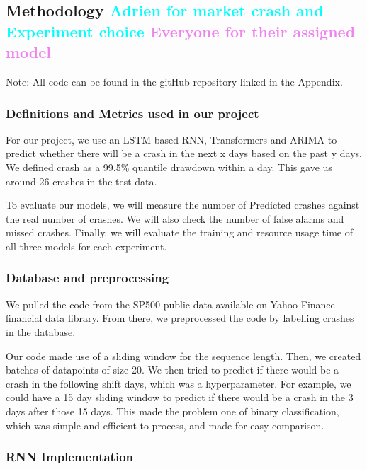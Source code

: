 \documentclass[12pt, letterpaper]{article}
\begin{document}
\subsection*{Methodology \textcolor{cyan}{Adrien for market crash and Experiment choice} \textcolor{violet}{Everyone for their assigned model}}
Note: All code can be found in the gitHub repository linked in the Appendix.
\subsubsection*{Definitions and Metrics used in our project}

For our project, we use an LSTM-based RNN, Transformers and ARIMA to predict whether there will be a crash in the next x days based on the past y days. We defined crash as a 99.5\% quantile drawdown within a day. This gave us around 26 crashes in the test data.

To evaluate our models, we will measure the number of Predicted crashes against the real number of crashes. We will also check the number of false alarms and missed crashes. Finally, we will evaluate the training and resource usage time of all three models for each experiment.

\subsubsection*{Database and preprocessing}

We pulled the code from the SP500 public data available on Yahoo Finance financial data library. From there, we preprocessed the code by labelling crashes in the database.

Our code made use of a sliding window for the sequence length. Then, we created batches of datapoints of size 20. We then tried to predict if there would be a crash in the following shift days, which was a hyperparameter. For example, we could have a 15 day sliding window to predict if there would be a crash in the 3 days after those 15 days. 
This made the problem one of binary classification, which was simple and efficient to process, and made for easy comparison.

\subsubsection*{RNN Implementation}
\end{document}
